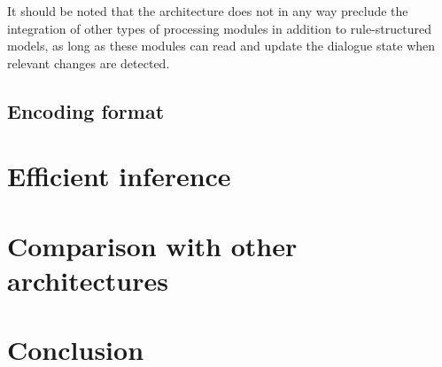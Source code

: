 It should be noted that the architecture does not in any way preclude the integration of other types of processing modules in addition to rule-structured models, as long as these modules can read and update the dialogue state when relevant changes are detected. 


\subsection{Encoding format}
\section{Efficient inference}



\section{Comparison with other architectures}


\section{Conclusion}
